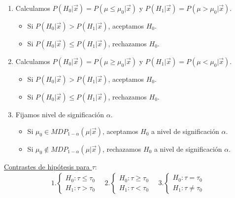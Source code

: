 \begin{enumerate}
    \item Calculamos $P(H_0 | \vec{x}) = P(\mu\leq \mu_0 |\vec{x})$ y $P(H_1 | \vec{x}) = P(\mu> \mu_0 | \vec{x})$.
          \begin{itemize}
              \item Si $P(H_0 | \vec{x}) > P(H_1 | \vec{x})$, aceptamos $H_0$.
              \item Si $P(H_0 | \vec{x}) \leq P(H_1 | \vec{x})$, rechazamos $H_0$.
          \end{itemize}
    \item Calculamos $P(H_0 | \vec{x}) = P(\mu \ge \mu_0 |\vec{x})$ y $P(H_1 | \vec{x}) = P(\mu < \mu_0 | \vec{x})$.
          \begin{itemize}
              \item Si $P(H_0 | \vec{x}) > P(H_1 | \vec{x})$, aceptamos $H_0$.
              \item Si $P(H_0 | \vec{x}) \leq P(H_1 | \vec{x})$, rechazamos $H_0$.
          \end{itemize}
    \item Fijamos nivel de significación $\alpha$.
          \begin{itemize}
              \item Si $\mu_0 \in MDP_{1 - \alpha}(\mu | \vec{x})$, aceptamos $H_0$ a nivel de significación $\alpha$.
              \item Si $\mu_0 \not\in MDP_{1 - \alpha}(\mu| \vec{x})$, rechazamos $H_0$ a nivel de significación $\alpha$.
          \end{itemize}
\end{enumerate}
\underline{Contrastes de hipótesis para $\tau$}:
\begin{align*}
    1. \begin{cases}
           H_0 : \tau \leq \tau_0 \\
           H_1 : \tau > \tau_0
       \end{cases} \quad     2.\begin{cases}
                                   H_0 : \tau \ge \tau_0 \\
                                   H_1 : \tau < \tau_0
                               \end{cases} \quad     3.\begin{cases}
                                                           H_0 : \tau = \tau_0 \\
                                                           H_1 : \tau \not = \tau_0
                                                       \end{cases}
\end{align*}

